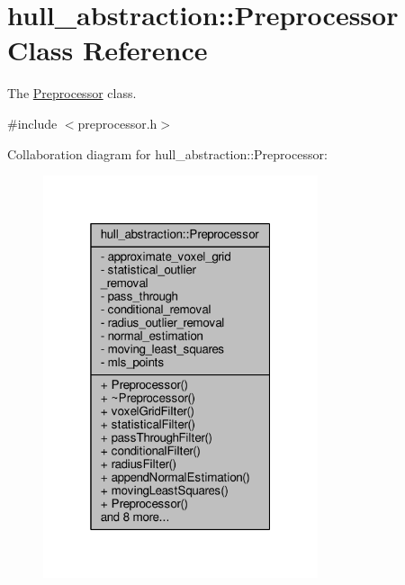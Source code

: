 \hypertarget{classhull__abstraction_1_1_preprocessor}{}\section{hull\+\_\+abstraction\+:\+:Preprocessor Class Reference}
\label{classhull__abstraction_1_1_preprocessor}


The \hyperlink{classhull__abstraction_1_1_preprocessor}{Preprocessor} class.  




{\ttfamily \#include $<$preprocessor.\+h$>$}



Collaboration diagram for hull\+\_\+abstraction\+:\+:Preprocessor\+:\nopagebreak
\begin{figure}[H]
\begin{center}
\leavevmode
\includegraphics[width=229pt]{classhull__abstraction_1_1_preprocessor__coll__graph}
\end{center}
\end{figure}

